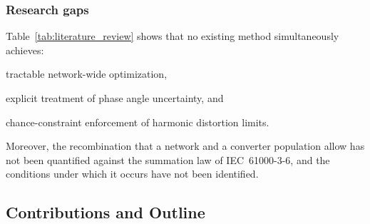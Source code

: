 \subsubsection{Research gaps}

Table~\ref{tab:literature_review} shows that no existing method simultaneously achieves:
\begin{enumerate*}
    \item [(i)] tractable network-wide optimization,
    \item [(ii)] explicit treatment of phase angle uncertainty, and
    \item [(iii)] chance-constraint enforcement of harmonic distortion limits.
\end{enumerate*}
Moreover, the recombination that a network and a converter population allow has not been quantified against the summation law of IEC~61000-3-6, and the conditions under which it occurs have not been identified.

\subsection{Contributions and Outline}
\label{sec:contribution_and_outline}

